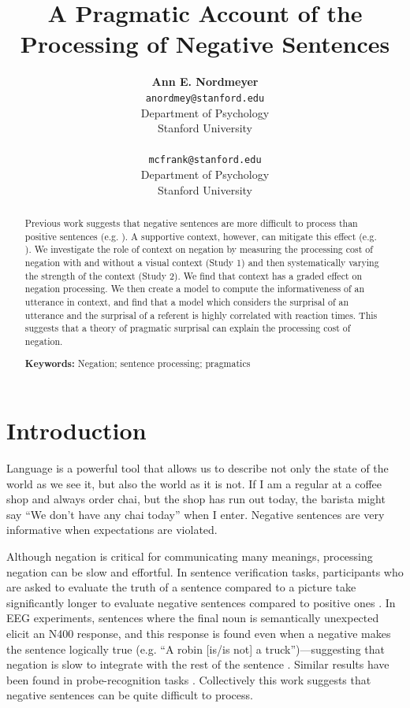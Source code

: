 \documentclass[10pt,letterpaper]{article}
\title{A Pragmatic Account of the Processing of Negative Sentences}
\author{{\large \bf Ann E. Nordmeyer} \\ \texttt{anordmey@stanford.edu}\\ Department of Psychology \\ Stanford University \\ 
\And {\large \bf Michael C. Frank} \\ \texttt{mcfrank@stanford.edu} \\ Department of Psychology \\ Stanford University \\ }
\begin{document}
\maketitle

\begin{abstract}

Previous work suggests that negative sentences are more difficult to process than positive sentences (e.g. ). A supportive context, however, can mitigate this effect (e.g. ).  We investigate the role of context on negation by measuring the processing cost of negation with and without a visual context (Study 1) and then systematically varying the strength of the context (Study 2).  We find that context has a graded effect on negation processing.  We then create a model to compute the informativeness of an utterance in context, and find that a model which considers the surprisal of an utterance and the surprisal of a referent is highly correlated with reaction times.  This suggests that a theory of pragmatic surprisal can explain the processing cost of negation.  

\textbf{Keywords:} 
Negation; sentence processing; pragmatics
\end{abstract}

\section{Introduction}

Language is a powerful tool that allows us to describe not only the state of the world as we see it, but also the world as it is not.  If I am a regular at a coffee shop and always order chai, but the shop has run out today, the barista might say ``We don't have any chai today'' when I enter.  Negative sentences are very informative when expectations are violated.

Although negation is critical for communicating many meanings, processing negation can be slow and effortful.  In sentence verification tasks, participants who are asked to evaluate the truth of a sentence compared to a picture take significantly longer to evaluate negative sentences compared to positive ones \cite{hclark1972, carpenter1975, just1971, just1976}. In EEG experiments, sentences where the final noun is semantically unexpected elicit an N400 response, and this response is found even when a negative makes the sentence logically true (e.g. ``A robin [is/is not] a truck'')---suggesting that negation is slow to integrate with the rest of the sentence \cite{fischler1983, ludtke2008}.  Similar results have been found in probe-recognition tasks \cite{kaup2003, kaup2006, hasson2006}.  Collectively this work suggests that negative sentences can be quite difficult to process.
 
\end{document}
